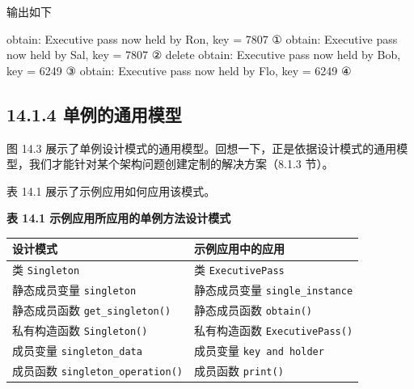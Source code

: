 输出如下

\begin{codebox}
obtain: Executive pass now held by Ron, key = 7807    ①
obtain: Executive pass now held by Sal, key = 7807    ②
delete
obtain: Executive pass now held by Bob, key = 6249    ③
obtain: Executive pass now held by Flo, key = 6249    ④
\end{codebox}
\par
{}\par
{}\par
{}\par

\subsection{14.1.4 单例的通用模型}

图 14.3 展示了单例设计模式的通用模型。回想一下，正是依据设计模式的通用模型，我们才能针对某个架构问题创建定制的解决方案（8.1.3 节）。


表 14.1 展示了示例应用如何应用该模式。

\begin{center}
{\bfseries 表 14.1 示例应用所应用的单例方法设计模式}\par\vspace{3bp}
\begin{tabularx}{\textwidth}{XX}
\toprule
设计模式 & 示例应用中的应用 \\
\midrule
类 \texttt{Singleton} & 类 \texttt{Executive\allowbreak{}Pass} \\
静态成员变量 \texttt{singleton} & 静态成员变量 \texttt{single\_\allowbreak{}instance} \\
静态成员函数 \texttt{get\_\allowbreak{}singleton(\allowbreak{})\allowbreak{}} & 静态成员函数 \texttt{obtain()} \\
私有构造函数 \texttt{Singleton(\allowbreak{})\allowbreak{}} & 私有构造函数 \texttt{Executive\allowbreak{}Pass(\allowbreak{})\allowbreak{}} \\
成员变量 \texttt{singleton\_\allowbreak{}data} & 成员变量 \texttt{key and holder} \\
成员函数 \texttt{singleton\_\allowbreak{}operation(\allowbreak{})\allowbreak{}} & 成员函数 \texttt{print()} \\
\bottomrule
\end{tabularx}
\end{center}

